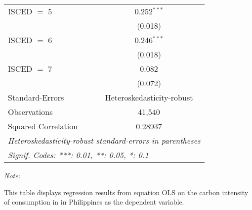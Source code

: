 \begin{table}[htbp!]
\begin{adjustbox}{width = 1\textwidth, max height = 0.95\textheight, center}
\begin{threeparttable}[b]
\begin{tabular}{lc}
            ISCED $=$ 5         & 0.252$^{***}$\\   
                                & (0.018)\\   
            ISCED $=$ 6         & 0.246$^{***}$\\   
                                & (0.018)\\   
            ISCED $=$ 7         & 0.082\\   
                                & (0.072)\\   
            \midrule 
            Standard-Errors     & Heteroskedasticity-robust \\   
            Observations        & 41,540\\  
            Squared Correlation & 0.28937\\  
            \midrule \midrule
            \multicolumn{2}{l}{\emph{Heteroskedasticity-robust standard-errors in parentheses}}\\
            \multicolumn{2}{l}{\emph{Signif. Codes: ***: 0.01, **: 0.05, *: 0.1}}\\
         \end{tabular}
         
         \begin{tablenotes}\item \medskip \textit{Note:}
            \item This table displays regression results from equation OLS on the carbon intensity of consumption in  in Philippines as the dependent variable. 
         \end{tablenotes}
      \end{threeparttable}
   \end{adjustbox}
\end{table}


